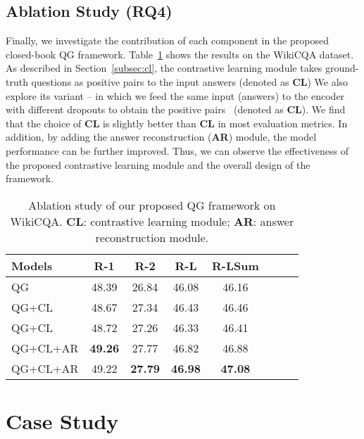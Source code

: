 \documentclass[11pt]{article}
\begin{document}
\subsection{Ablation Study (RQ4)}
Finally, we investigate the contribution of each component in the proposed closed-book QG framework. Table~\ref{tab:ablation-results} shows the results on the WikiCQA dataset. As described in Section~\ref{subsec:cl}, the  contrastive learning module takes ground-truth questions as positive pairs to the input answers (denoted as \textbf{CL})
We also explore its variant -- in which we feed the same input (answers) to the encoder with different dropouts to obtain the positive pairs~\cite{gao-etal-2021-simcse} (denoted as \textbf{CL}). We find that the choice of \textbf{CL} is slightly better than \textbf{CL} in most evaluation metrics. In addition, by adding the answer reconstruction (\textbf{AR}) module, the model performance can be further improved. Thus, we can observe the effectiveness of the proposed contrastive learning module and the overall design of the framework.

\begin{table}[htbp!]
\centering\small
\begin{tabular}{lccccccc}
\hline
\textbf{Models} & \textbf{R-1} & \textbf{R-2} & \textbf{R-L} & \textbf{R-LSum}\\
\hline
QG & 48.39 & 26.84 & 46.08 & 46.16  \\
QG+CL & 48.67 & 27.34 & 46.43 & 46.46 \\
QG+CL & 48.72 & 27.26 & 46.33 & 46.41 \\
QG+CL+AR & \textbf{49.26} & 27.77 & 46.82 & 46.88 \\
QG+CL+AR & 49.22 & \textbf{27.79} & \textbf{46.98} & \textbf{47.08} \\
\hline
\end{tabular}
\caption{Ablation study of our proposed QG framework on WikiCQA. \textbf{CL}: contrastive learning module; \textbf{AR}: answer reconstruction module.}
\label{tab:ablation-results}
\end{table}
\vspace{-0.5cm}







\section{Case Study}
\end{document}
